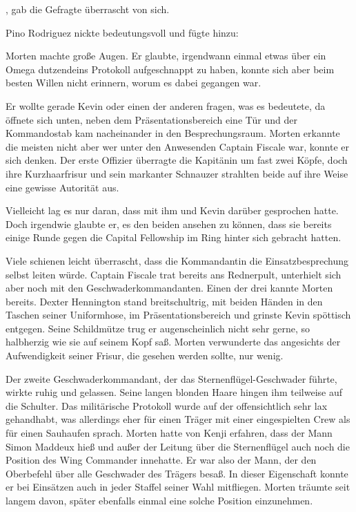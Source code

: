 \par

, gab die Gefragte überrascht von sich.

\par

Pino Rodriguez nickte bedeutungsvoll und fügte hinzu: 

\par

Morten machte große Augen. Er glaubte, irgendwann einmal etwas über ein Omega dutzendeins Protokoll aufgeschnappt zu haben, konnte sich aber beim besten Willen nicht erinnern, worum es dabei gegangen war.

\par

Er wollte gerade Kevin oder einen der anderen fragen, was es bedeutete, da öffnete sich unten, neben dem Präsentationsbereich eine Tür und der Kommandostab kam nacheinander in den Besprechungsraum. Morten erkannte die meisten nicht aber wer unter den Anwesenden Captain Fiscale war, konnte er sich denken. Der erste Offizier überragte die Kapitänin um fast zwei Köpfe, doch ihre Kurzhaarfrisur und sein markanter Schnauzer strahlten beide auf ihre Weise eine gewisse Autorität aus.

\par

Vielleicht lag es nur daran, dass mit ihm und Kevin darüber gesprochen hatte. Doch irgendwie glaubte er, es den beiden ansehen zu können, dass sie bereits einige Runde gegen die Capital Fellowship im Ring hinter sich gebracht hatten.

\par

Viele schienen leicht überrascht, dass die Kommandantin die Einsatzbesprechung selbst leiten würde. Captain Fiscale trat bereits ans Rednerpult, unterhielt sich aber noch mit den Geschwaderkommandanten. Einen der drei kannte Morten bereits. Dexter Hennington stand breitschultrig, mit beiden Händen in den Taschen seiner Uniformhose, im Präsentationsbereich und grinste Kevin spöttisch entgegen. Seine Schildmütze trug er augenscheinlich nicht sehr gerne, so halbherzig wie sie auf seinem Kopf saß. Morten verwunderte das angesichts der Aufwendigkeit seiner Frisur, die gesehen werden sollte, nur wenig.

\par

Der zweite Geschwaderkommandant, der das Sternenflügel-Geschwader führte, wirkte ruhig und gelassen. Seine langen blonden Haare hingen ihm teilweise auf die Schulter. Das militärische Protokoll wurde auf der  offensichtlich sehr lax gehandhabt, was allerdings eher für einen Träger mit einer eingespielten Crew als für einen Sauhaufen sprach. Morten hatte von Kenji erfahren, dass der Mann Simon Maddeux hieß und außer der Leitung über die Sternenflügel auch noch die Position des Wing Commander innehatte. Er war also der Mann, der den Oberbefehl über alle Geschwader des Trägers besaß. In dieser Eigenschaft konnte er bei Einsätzen auch in jeder Staffel seiner Wahl mitfliegen. Morten träumte seit langem davon, später ebenfalls einmal eine solche Position einzunehmen.

